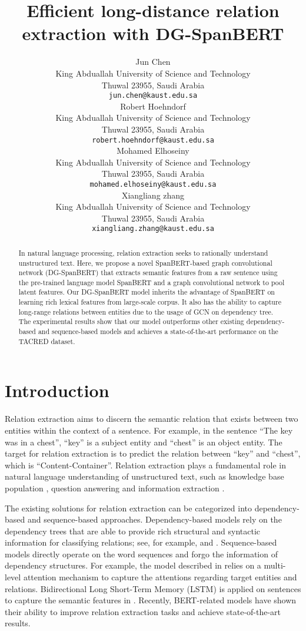 \documentclass{article}
\title{Efficient long-distance relation extraction with DG-SpanBERT}
\author{
 Jun Chen \\
  King Abduallah University of Science and Technology\\
  Thuwal 23955, Saudi Arabia \\
  \texttt{jun.chen@kaust.edu.sa} \\
\And
  Robert Hoehndorf \\
  King Abduallah University of Science and Technology\\
  Thuwal 23955, Saudi Arabia \\
  \texttt{robert.hoehndorf@kaust.edu.sa} \\
  \And
  Mohamed Elhoseiny \\
  King Abduallah University of Science and Technology\\
  Thuwal 23955, Saudi Arabia \\
  \texttt{mohamed.elhoseiny@kaust.edu.sa} \\
  \And
   Xiangliang zhang \\
  King Abduallah University of Science and Technology\\
  Thuwal 23955, Saudi Arabia \\
  \texttt{xiangliang.zhang@kaust.edu.sa} \\
}
\begin{document}
\maketitle
\begin{abstract}
In natural language processing, relation extraction seeks to rationally understand unstructured text. Here, we propose a novel SpanBERT-based graph convolutional network (DG-SpanBERT) that extracts semantic features from a raw sentence using the pre-trained language model SpanBERT and a graph convolutional network to pool latent features. Our DG-SpanBERT model inherits the advantage of SpanBERT on learning rich lexical features from large-scale corpus. It also has the ability to capture long-range relations between entities due to the usage of GCN on dependency tree. The experimental results  show that our model outperforms other existing dependency-based and sequence-based models and achieves a state-of-the-art performance on the TACRED dataset.  
\end{abstract}





\section{Introduction}
Relation extraction aims to discern the semantic relation that exists between two entities within the context of a sentence. For example, in the sentence ``The key was in a chest'', ``key'' is a subject entity and ``chest'' is an object entity. The target for relation extraction is to predict the relation between ``key'' and ``chest'', which is ``Content-Container''. Relation extraction plays a fundamental role in natural language understanding of unstructured text, such as knowledge base population \cite{ji2011knowledge}, question answering \cite{yu2017improved} and information extraction \cite{fader2011identifying}.

The existing solutions for relation extraction can be categorized into dependency-based and sequence-based approaches. Dependency-based models rely on the dependency trees that are able to provide rich structural and syntactic information for classifying relations; see, for example, \cite{peng2017cross} and \cite{zhang2018graph}. Sequence-based models directly operate on the word sequences and forgo the information of dependency structures. For example, the model described in \cite{wang2016relation} relies on a multi-level attention mechanism to capture the attentions regarding target entities and relations. Bidirectional Long Short-Term Memory (LSTM) is applied on sentences   to capture the semantic features in \cite{zhou2016attention}. Recently, BERT-related models \cite{joshi2019spanbert,wu2019enriching,soares2019matching} have shown their ability to improve relation extraction tasks and achieve state-of-the-art results.  
\end{document}

